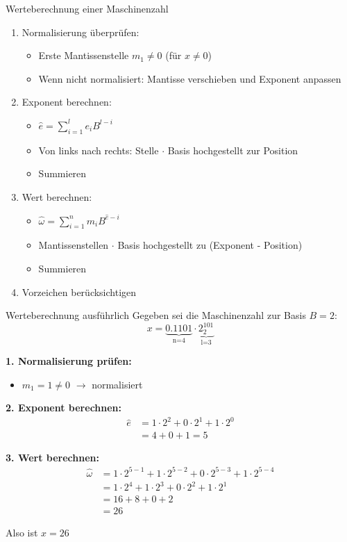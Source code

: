 \begin{KR}{Werteberechnung einer Maschinenzahl} 
\begin{enumerate}
    \item Normalisierung überprüfen:
    \begin{itemize}
        \item Erste Mantissenstelle $m_1 \neq 0$ (für $x \neq 0$)
        \item Wenn nicht normalisiert: Mantisse verschieben und Exponent anpassen
    \end{itemize}
    
    \item Exponent berechnen:
    \begin{itemize}
        \item $\hat{e} = \sum_{i=1}^l e_i B^{l-i}$ 
        \item Von links nach rechts: Stelle $\cdot$ Basis hochgestellt zur Position
        \item Summieren
    \end{itemize}
    
    \item Wert berechnen:
    \begin{itemize}
        \item $\hat{\omega} = \sum_{i=1}^n m_i B^{\hat{e}-i}$
        \item Mantissenstellen $\cdot$ Basis hochgestellt zu (Exponent - Position)
        \item Summieren
    \end{itemize}
    
    \item Vorzeichen berücksichtigen
\end{enumerate}
\end{KR}

\begin{example2}{Werteberechnung ausführlich} 
Gegeben sei die Maschinenzahl zur Basis $B=2$:
$$x = \underbrace{0.1101}_{\text{n=4}} \cdot \underbrace{2^{101}_2}_{\text{l=3}}$$

\textbf{1. Normalisierung prüfen:}
\begin{itemize}
    \item $m_1 = 1 \neq 0$ $\rightarrow$ normalisiert
\end{itemize}

\textbf{2. Exponent berechnen:}
\begin{align*}
\hat{e} &= 1 \cdot 2^2 + 0 \cdot 2^1 + 1 \cdot 2^0 \\
&= 4 + 0 + 1 = 5
\end{align*}

\textbf{3. Wert berechnen:}
\begin{align*}
\hat{\omega} &= 1 \cdot 2^{5-1} + 1 \cdot 2^{5-2} + 0 \cdot 2^{5-3} + 1 \cdot 2^{5-4} \\
&= 1 \cdot 2^4 + 1 \cdot 2^3 + 0 \cdot 2^2 + 1 \cdot 2^1 \\
&= 16 + 8 + 0 + 2 \\
&= 26
\end{align*}

Also ist $x = 26$
\end{example2}

